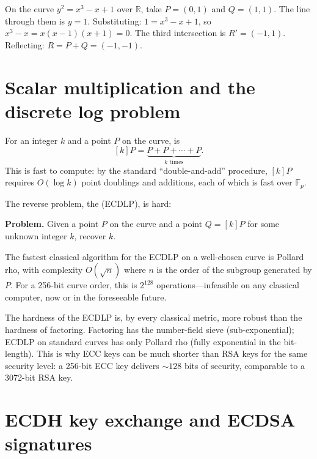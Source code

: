\begin{example}
On the curve $y^2 = x^3 - x + 1$ over $\mathbb{R}$, take $P = (0,1)$ and $Q = (1,1)$. The line through them is $y = 1$. Substituting: $1 = x^3 - x + 1$, so $x^3 - x = x(x-1)(x+1) = 0$. The third intersection is $R' = (-1, 1)$. Reflecting: $R = P + Q = (-1, -1)$.
\end{example}

\section{Scalar multiplication and the discrete log problem}

For an integer $k$ and a point $P$ on the curve,  is
\[
  [k]P = \underbrace{P + P + \cdots + P}_{k \text{ times}}.
\]
This is fast to compute: by the standard ``double-and-add'' procedure, $[k]P$ requires $O(\log k)$ point doublings and additions, each of which is fast over $\mathbb{F}_p$.

The reverse problem, the  (ECDLP), is hard:

\textbf{Problem.} Given a point $P$ on the curve and a point $Q = [k]P$ for some unknown integer $k$, recover $k$.

The fastest classical algorithm for the ECDLP on a well-chosen curve is Pollard rho, with complexity $O(\sqrt{n})$ where $n$ is the order of the subgroup generated by $P$. For a 256-bit curve order, this is $2^{128}$ operations---infeasible on any classical computer, now or in the foreseeable future.

The hardness of the ECDLP is, by every classical metric, more robust than the hardness of factoring. Factoring has the number-field sieve (sub-exponential); ECDLP on standard curves has only Pollard rho (fully exponential in the bit-length). This is why ECC keys can be much shorter than RSA keys for the same security level: a 256-bit ECC key delivers $\sim 128$ bits of security, comparable to a 3072-bit RSA key.

\section{ECDH key exchange and ECDSA signatures}

